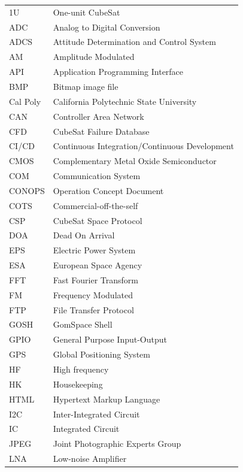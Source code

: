 \documentclass[english,12pt,a4paper,pdftex,elec,utf8]{aaltothesis}
\begin{document}


\begin{tabular}{ll}
1U 		& One-unit CubeSat \\
ADC		& Analog to Digital Conversion \\
ADCS 	& Attitude Determination and Control System \\
AM 		& Amplitude Modulated \\
API 	& Application Programming Interface \\
BMP		& Bitmap image file \\
Cal Poly	& California Polytechnic State University \\
CAN 	& Controller Area Network \\
CFD 	& CubeSat Failure Database \\
CI/CD 	& Continuous Integration/Continuous Development \\
CMOS 	& Complementary Metal Oxide Semiconductor \\
COM 	& Communication System \\
CONOPS 	& Operation Concept Document \\
COTS 	& Commercial-off-the-self \\
CSP 	& CubeSat Space Protocol \\
DOA 	& Dead On Arrival \\
EPS      & Electric Power System \\
ESA 	& European Space Agency \\
FFT 	& Fast Fourier Transform \\
FM 		& Frequency Modulated \\
FTP 	& File Transfer Protocol \\
GOSH 	& GomSpace Shell \\
GPIO 	& General Purpose Input-Output \\
GPS 	& Global Positioning System \\
HF 		& High frequency \\
HK 		& Housekeeping \\
HTML	& Hypertext Markup Language \\
I2C 	& Inter-Integrated Circuit \\
IC 		& Integrated Circuit \\
JPEG 	& Joint Photographic Experts Group \\
LNA 	& Low-noise Amplifier \\

\end{tabular}
\end{document}

